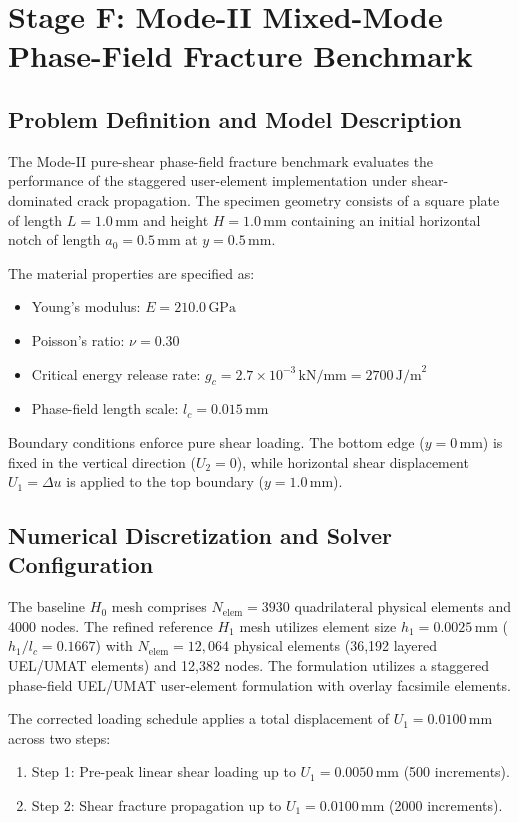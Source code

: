 \chapter{Stage F: Mode-II Mixed-Mode Phase-Field Fracture Benchmark}
\label{chap:stage_f_mode_ii}

\section{Problem Definition and Model Description}
The Mode-II pure-shear phase-field fracture benchmark evaluates the performance of the staggered user-element implementation under shear-dominated crack propagation. The specimen geometry consists of a square plate of length $L = 1.0\,\text{mm}$ and height $H = 1.0\,\text{mm}$ containing an initial horizontal notch of length $a_0 = 0.5\,\text{mm}$ at $y = 0.5\,\text{mm}$.

The material properties are specified as:
\begin{itemize}
    \item Young's modulus: $E = 210.0\,\text{GPa}$
    \item Poisson's ratio: $\nu = 0.30$
    \item Critical energy release rate: $g_c = 2.7 \times 10^{-3}\,\text{kN/mm} = 2700\,\text{J/m}^2$
    \item Phase-field length scale: $l_c = 0.015\,\text{mm}$
\end{itemize}

Boundary conditions enforce pure shear loading. The bottom edge ($y = 0\,\text{mm}$) is fixed in the vertical direction ($U_2 = 0$), while horizontal shear displacement $U_1 = \Delta u$ is applied to the top boundary ($y = 1.0\,\text{mm}$).

\section{Numerical Discretization and Solver Configuration}
The baseline $H_0$ mesh comprises $N_{\mathrm{elem}} = 3930$ quadrilateral physical elements and 4000 nodes. The refined reference $H_1$ mesh utilizes element size $h_1 = 0.0025\,\text{mm}$ ($h_1/l_c = 0.1667$) with $N_{\mathrm{elem}} = 12,064$ physical elements (36,192 layered UEL/UMAT elements) and 12,382 nodes. The formulation utilizes a staggered phase-field UEL/UMAT user-element formulation with overlay facsimile elements.

The corrected loading schedule applies a total displacement of $U_1 = 0.0100\,\text{mm}$ across two steps:
\begin{enumerate}
    \item Step 1: Pre-peak linear shear loading up to $U_1 = 0.0050\,\text{mm}$ (500 increments).
    \item Step 2: Shear fracture propagation up to $U_1 = 0.0100\,\text{mm}$ (2000 increments).
\end{enumerate}

